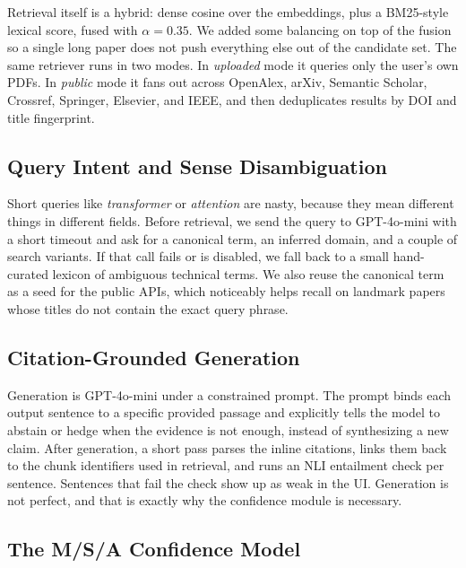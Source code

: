 \documentclass[10pt]{article}
\begin{document}
Retrieval itself is a hybrid: dense cosine over the embeddings, plus
a BM25-style lexical score, fused with $\alpha = 0.35$. We added
some balancing on top of the fusion so a single long paper does not
push everything else out of the candidate set. The same retriever
runs in two modes. In \emph{uploaded} mode it queries only the user's
own PDFs. In \emph{public} mode it fans out across OpenAlex, arXiv,
Semantic Scholar, Crossref, Springer, Elsevier, and IEEE, and then
deduplicates results by DOI and title fingerprint.

\subsection{Query Intent and Sense Disambiguation}
Short queries like \emph{transformer} or \emph{attention} are nasty,
because they mean different things in different fields. Before
retrieval, we send the query to GPT-4o-mini with a short timeout and
ask for a canonical term, an inferred domain, and a couple of search
variants. If that call fails or is disabled, we fall back to a small
hand-curated lexicon of ambiguous technical terms. We also reuse the
canonical term as a seed for the public APIs, which noticeably helps
recall on landmark papers whose titles do not contain the exact query
phrase.

\subsection{Citation-Grounded Generation}
Generation is GPT-4o-mini under a constrained prompt. The prompt
binds each output sentence to a specific provided passage and
explicitly tells the model to abstain or hedge when the evidence is
not enough, instead of synthesizing a new claim. After generation, a
short pass parses the inline citations, links them back to the chunk
identifiers used in retrieval, and runs an NLI entailment check per
sentence. Sentences that fail the check show up as weak in the UI.
Generation is not perfect, and that is exactly why the confidence
module is necessary.

\subsection{The M/S/A Confidence Model}
\end{document}
